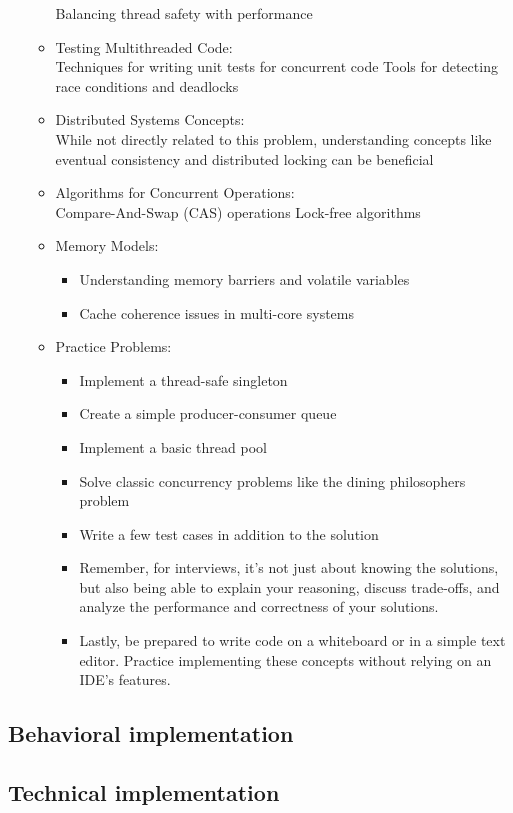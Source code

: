 \documentclass{article}
\begin{document}
\begin{itemize}
\begin{itemize}
Balancing thread safety with performance
			\item Testing Multithreaded Code: \\
Techniques for writing unit tests for concurrent code
Tools for detecting race conditions and deadlocks
			\item Distributed Systems Concepts: \\
While not directly related to this problem, understanding concepts like eventual consistency and distributed locking can be beneficial
			\item Algorithms for Concurrent Operations: \\
Compare-And-Swap (CAS) operations
Lock-free algorithms
			\item Memory Models:
				\begin{itemize}
					\item Understanding memory barriers and volatile variables
					\item Cache coherence issues in multi-core systems
				\end{itemize}
\item Practice Problems:
	\begin{itemize}
		\item Implement a thread-safe singleton
		\item Create a simple producer-consumer queue
		\item Implement a basic thread pool
		\item Solve classic concurrency problems like the dining philosophers problem
		\item Write a few test cases in addition to the solution
		\item Remember, for interviews, it's not just about knowing the solutions, but also being able to explain your reasoning, discuss trade-offs, and analyze the performance and correctness of your solutions.
		\item Lastly, be prepared to write code on a whiteboard or in a simple text editor. Practice implementing these concepts without relying on an IDE's features.
	\end{itemize}
\end{itemize}
\end{itemize}

\subsection{Behavioral implementation}
\subsection{Technical implementation}
\end{document}
